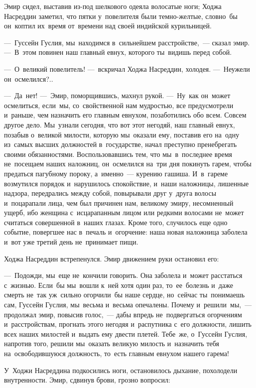 \documentclass[12pt,a4paper]{book}
\begin{document}
Эмир сидел, выставив из-под шелкового одеяла волосатые ноги; Ходжа Насреддин заметил, что пятки у~повелителя были темно-желтые, словно~бы он~коптил их~время от~времени над своей индийской курильницей.

—~Гуссейн Гуслия, мы~находимся в~сильнейшем расстройстве,~— сказал эмир. —~В~этом повинен наш главный евнух, которого ты~видишь перед собой.

—~О~великий повелитель! —~вскричал Ходжа Насреддин, холодея. —~Неужели он~осмелился?..

—~Да~нет! —~Эмир, поморщившись, махнул рукой. —~Ну~как он~может осмелиться, если~мы, со~свойственной нам мудростью, все предусмотрели и~раньше, чем назначить его главным евнухом, позаботились обо всем. Совсем другое дело. Мы~узнали сегодня, что вот этот негодяй, наш главный евнух, позабыв о~великой милости, которую мы~оказали ему, поставив его на~одну из~самых высших должностей в~государстве, начал преступно пренебрегать своими обязанностями. Воспользовавшись тем, что мы~в~последнее время не~посещаем наших наложниц, он~осмелился на~три дня покинуть гарем, чтобы предаться пагубному пороку, а~именно~— курению гашиша. И~в~гареме возмутился порядок и~нарушилось спокойствие, и~наши наложницы, лишенные надзора, передрались между собой, повырывали друг у~друга волосы и~поцарапали лица, чем был причинен нам, великому эмиру, несомненный ущерб, ибо женщина с~исцарапанным лицом или редкими волосами не~может считаться совершенной в~наших глазах. Кроме того, случилось еще одно событие, повергшее нас в~печаль и~огорчение: наша новая наложница заболела и~вот уже третий день не~принимает пищи.

Ходжа Насреддин встрепенулся. Эмир движением руки остановил его:

—~Подожди, мы~еще не~кончили говорить. Она заболела и~может расстаться с~жизнью. Если~бы мы~вошли к~ней хотя один раз, то~ее~болезнь и~даже смерть не~так уж~сильно огорчили~бы наше сердце, но~сейчас ты~понимаешь сам, Гуссейн Гуслия, мы~весьма и~весьма опечалены. Почему и~решили~мы,~— продолжал эмир, повысив голос,~— дабы впредь не~подвергаться огорчениям и~расстройствам, прогнать этого негодяя и~распутника с~его должности, лишить всех наших милостей и~выдать ему двести плетей. Тебе~же, о~Гуссейн Гуслия, напротив того, решили мы~оказать великую милость и~назначить тебя на~освободившуюся должность, то~есть главным евнухом нашего гарема!

У~Ходжи Насреддина подкосились ноги, остановилось дыхание, похолодели внутренности. Эмир, сдвинув брови, грозно вопросил:
\end{document}
